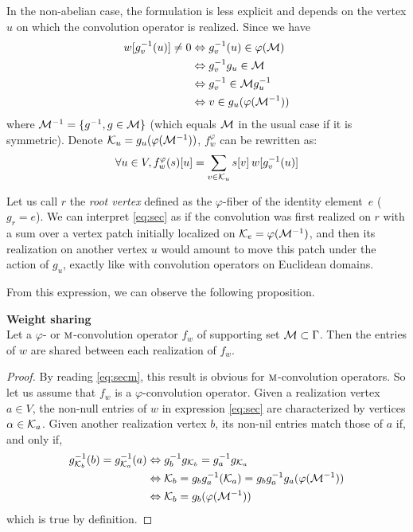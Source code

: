 In the non-abelian case, the formulation is less explicit and depends on the vertex $u$ on which the convolution operator is realized. Since we have
\begin{align*}
w[g_v^{-1}(u)] \neq 0 & \Leftrightarrow g_v^{-1}(u) \in \varphi(\cm)\\
                    & \Leftrightarrow g_v^{-1}g_u \in \cm\\
                    & \Leftrightarrow g_v^{-1} \in \cm g_u^{-1}\\
                    & \Leftrightarrow v \in g_u(\varphi(\cm^{-1}))
\end{align*}
where $\cm^{-1} = \{ g^{-1}, g \in \cm\}$ (which equals $\cm$ in the usual case if it is symmetric). Denote $\ck_u = g_u(\varphi(\cm^{-1}))$, $f_w^{\varphi}$ can be rewritten as:
\begin{gather}
\forall u \in V, f_w^{\varphi}(s)[u] = \displaystyle\sum_{ v \in \ck_u} s[v] \h{2} w[g_v^{-1}(u)] \label{eq:sec}
\end{gather}

Let us call $r$ the \emph{root vertex} defined as the $\varphi$-fiber of the identity element~$e$ (\ie $g_r = e$). We can interpret \eqref{eq:sec} as if the convolution was first realized on $r$ with a sum over a vertex patch initially localized on $\ck_e = \varphi(\cm^{-1})$, and then its realization on another vertex $u$ would amount to move this patch under the action of $g_u$, exactly like with convolution operators on Euclidean domains.

From this expression, we can observe the following proposition.

\begin{proposition}\textbf{Weight sharing}\\
Let a $\varphi$- or $\M$-convolution operator $f_w$ of supporting set $\cm \subset \Gamma$. Then the entries of $w$ are shared between each realization of $f_w$.
\label{prop:ws}
\end{proposition}
\begin{proof}
By reading \eqref{eq:secm}, this result is obvious for $\M$-convolution operators. So let us assume that $f_w$ is a $\varphi$-convolution operator. Given a realization vertex $a \in V$, the non-null entries of $w$ in expression \eqref{eq:sec} are characterized by vertices $\alpha \in \ck_a$. Given another realization vertex $b$, its non-nil entries match those of $a$ if, and only if,
\begin{align*}
g_{\ck_b}^{-1}(b) = g_{\ck_a}^{-1}(a)
  & \Leftrightarrow  g_{b}^{-1}g_{\ck_{b}} = g_a^{-1}g_{\ck_a}\\
  & \Leftrightarrow  \ck_{b} = g_{b}g_a^{-1}(\ck_a) = g_{b}g_a^{-1}g_a(\varphi(\cm^{-1}))\\
  & \Leftrightarrow  \ck_{b} = g_{b}(\varphi(\cm^{-1}))
\end{align*}
which is true by definition.
\end{proof}

